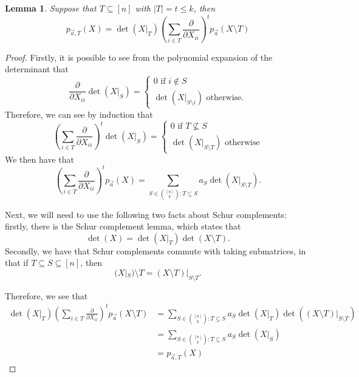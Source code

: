 \documentclass{amsart}
\newtheorem{lemma}[thm]{Lemma}
\theoremstyle{definition}
\numberwithin{equation}{section}
\begin{document}
\begin{lemma}\label{lem:poly_cond}
    Suppose that $T\subseteq [n]$ with $|T| = t \le k$, then
\[
    p_{\vec{a}, T}(X) = \det(X|_T) \left( \sum_{i \in T} \frac{\partial}{\partial X_{ii}} \right)^{t}p_{\vec{a}}(X \setminus T) 
\]
\end{lemma}
\begin{proof}
    Firstly, it is possible to see from the polynomial expansion of the determinant that
    \[
        \frac{\partial}{\partial X_{ii}}\det(X|_S) = 
        \begin{cases}
            0 \text{ if }i \not \in S\\
            \det(X|_{S \setminus i}) \text{ otherwise}.            
        \end{cases}
    \]
    Therefore, we can see by induction that 
    \[
        \left( \sum_{i \in T} \frac{\partial}{\partial X_{ii}} \right)^{t}\det(X|_S) = 
        \begin{cases}
            0 \text{ if }T\not \subseteq S\\
            \det(X|_{S \setminus T}) \text{ otherwise}
        \end{cases}
    \]
    We then have that 
    \[
        \left( \sum_{i \in T} \frac{\partial}{\partial X_{ii}} \right)^{t}p_{\vec{a}}(X) = \sum_{S \in \binom{[n]}{k} : T \subseteq S}
        a_S \det(X|_{S \setminus T}).
    \]

    Next, we will need to use the following two facts about Schur complements: 
    firstly, there is the Schur complement lemma, which states that
    \[
        \det(X) = \det(X|_T) \det(X \setminus T).
    \]
    Secondly, we have that Schur complements commute with taking submatrices, in that if $T \subseteq S \subseteq [n]$, then
    \[
        (X|_S) \setminus T = (X \setminus T)|_{S \setminus T}.
    \]

    Therefore, we see that 
    \begin{align*}
        \det(X|_T)\left( \sum_{i \in T} \frac{\partial}{\partial X_{ii}} \right)^{t}p_{\vec{a}}(X \setminus T)
        &= \sum_{S \in \binom{[n]}{k} : T \subseteq S}
        a_S \det(X|_T)\det((X\setminus T)|_{S \setminus T})\\
        &= \sum_{S \in \binom{[n]}{k} : T \subseteq S} a_S \det(X|_S)\\
        &= p_{\vec{a}, T}(X)
    \end{align*}

    
\end{proof}
\end{document}
